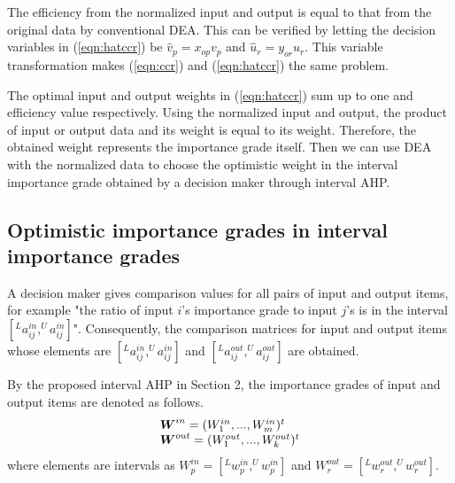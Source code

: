 The efficiency from the normalized input and output is equal to that from the original data by conventional DEA. 
This can be verified by letting the decision variables in (\ref{eqn:hatccr}) be 
$\hat{\mbox{$v$}}_{p}={\mbox{$x$}_{op}}{\mbox{$v$}_{p}}$ and 
$\hat{\mbox{$u$}}_{r}={\mbox{$y$}_{or}}{\mbox{$u$}_{r}}$.
This variable transformation makes (\ref{eqn:ccr}) and (\ref{eqn:hatccr}) the same problem. 

The optimal input and output weights in (\ref{eqn:hatccr}) sum up to one and efficiency value respectively. 
Using the normalized input and output, the product of input or output data and its weight is equal to its weight. 
Therefore, the obtained weight represents the importance grade itself. 
Then we can use DEA with the normalized data to choose the optimistic weight in the interval importance grade obtained by a decision maker through interval AHP. 

\subsection{Optimistic importance grades in interval importance grades}

A decision maker gives comparison values for all pairs of input and output items, for example "the ratio of input $i$'s importance grade to input $j$'s is in the interval $\left[^La_{ij}^{in},^Ua_{ij}^{in} \right]$". 
Consequently, the comparison matrices for input and output items whose elements are 
$\left[^La_{ij}^{in},^Ua_{ij}^{in} \right]$ and 
$\left[^La_{ij}^{out},^Ua_{ij}^{out} \right]$ are obtained. 

By the proposed interval AHP in Section 2, 
the importance grades of input and output items are denoted as follows. 
\[
\begin{array}{l}
\mbox{\boldmath$W$}^{in}=(W_{1}^{in},...,W_{m}^{in})^t \\ 
\mbox{\boldmath$W$}^{out}=(W_{1}^{out},...,W_{k}^{out})^t
\end{array}
\] 
where elements are intervals as
$W_{p}^{in}=\left[^Lw_{p}^{in},^Uw_{p}^{in} \right]$ 
and 
$W_{r}^{out}=\left[^Lw_{r}^{out},^Uw_{r}^{out} \right]$. 

